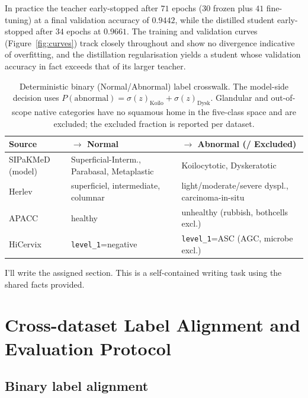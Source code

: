 \documentclass[twocolumn]{article}
\begin{document}
In practice the teacher early-stopped after $71$ epochs ($30$ frozen plus $41$ fine-tuning) at a final validation accuracy of $0.9442$, while the distilled student early-stopped after $34$ epochs at $0.9661$. The training and validation curves (Figure~\ref{fig:curves}) track closely throughout and show no divergence indicative of overfitting, and the distillation regularisation yields a student whose validation accuracy in fact exceeds that of its larger teacher.


\begin{table}[t]
\caption{Deterministic binary (Normal/Abnormal) label crosswalk. The model-side decision uses
$P(\mathrm{abnormal})=\sigma(z)_{\mathrm{Koilo}}+\sigma(z)_{\mathrm{Dysk}}$. Glandular and
out-of-scope native categories have no squamous home in the five-class space and are excluded; the
excluded fraction is reported per dataset.}
\label{tab:mapping}
\centering\small
\begin{tabular}{lll}
\toprule
Source & $\rightarrow$ Normal & $\rightarrow$ Abnormal \quad(/ Excluded) \\
\midrule
SIPaKMeD (model) & Superficial-Interm., Parabasal, Metaplastic & Koilocytotic, Dyskeratotic \\
Herlev & superficiel, intermediate, columnar & light/moderate/severe dyspl., carcinoma-in-situ \\
APACC & healthy & unhealthy \quad(rubbish, bothcells excl.) \\
HiCervix & \texttt{level\_1}=negative & \texttt{level\_1}=ASC \quad(AGC, microbe excl.) \\
\bottomrule
\end{tabular}
\end{table}

I'll write the assigned section. This is a self-contained writing task using the shared facts provided.

\section{Cross-dataset Label Alignment and Evaluation Protocol}

\subsection{Binary label alignment}
\end{document}

